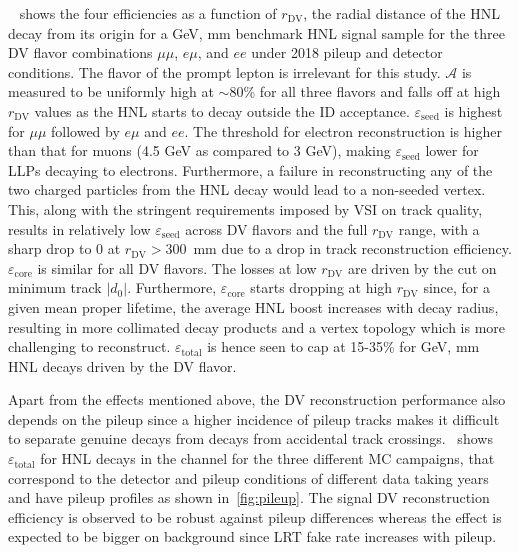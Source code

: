 ~ shows the four efficiencies as a function of $r_\text{DV}$, the radial distance of the HNL decay from its origin for a  GeV,  mm benchmark HNL signal sample for the three DV flavor combinations $\mu\mu$, $e\mu$, and $ee$ under 2018 pileup and detector conditions. The flavor of the prompt lepton is irrelevant for this study. $\mathcal{A}$ is measured to be uniformly high at $\sim$80\% for all three flavors and falls off at high $r_\text{DV}$ values as the HNL starts to decay outside the ID acceptance. $\varepsilon_\mathrm{seed}$ is highest for $\mu\mu$ followed by $e\mu$ and $ee$. The \pT threshold for electron reconstruction is higher than that for muons (4.5 GeV as compared to 3 GeV), making $\varepsilon_\mathrm{seed}$ lower for LLPs decaying to electrons. Furthermore, a failure in reconstructing any of the two charged particles from the HNL decay would lead to a non-seeded vertex. This, along with the stringent requirements imposed by VSI on track quality, results in relatively low $\varepsilon_\mathrm{seed}$ across DV flavors and the full $r_\text{DV}$ range, with a sharp drop to 0 at $r_\text{DV}>300$~mm due to a drop in track reconstruction efficiency. $\varepsilon_\mathrm{core}$ is similar for all DV flavors. The losses at low $r_\text{DV}$ are driven by the cut on minimum track $|d_0|$. Furthermore, $\varepsilon_\mathrm{core}$ starts dropping at high $r_\text{DV}$ since, for a given mean proper lifetime, the average HNL boost increases with decay radius, resulting in more collimated decay products and a vertex topology which is more challenging to reconstruct. $\varepsilon_\mathrm{total}$ is hence seen to cap at 15-35\% for  GeV,  mm HNL decays driven by the DV flavor.

Apart from the effects mentioned above, the DV reconstruction performance also depends on the pileup since a higher incidence of pileup tracks makes it difficult to separate genuine decays from decays from accidental track crossings.~ shows $\varepsilon_\mathrm{total}$ for HNL decays in the \uuu channel for the three different MC campaigns, that correspond to the detector and pileup conditions of different data taking years and have pileup profiles as shown in~\cref{fig:pileup}. The signal DV reconstruction efficiency is observed to be robust against pileup differences whereas the effect is expected to be bigger on background since LRT fake rate increases with pileup.

